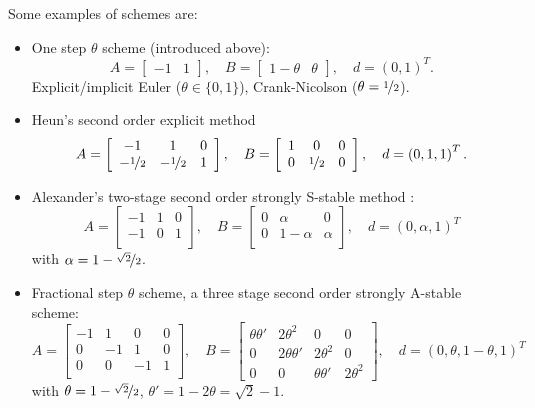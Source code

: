 \documentclass[a4paper,12pt]{article}
\begin{document}
Some examples of schemes are:
\begin{itemize}
\item One step $\theta$ scheme (introduced above):
\begin{equation*}
A = \left[\begin{array}{cc}
-1 & 1
\end{array}\right],
\quad B = \left[\begin{array}{cc}
1-\theta & \theta
\end{array}\right],
\quad d = \left(
0, 1
\right)^T.
\end{equation*}
Explicit/implicit Euler ($\theta\in\{0,1\}$), Crank-Nicolson ($\theta=\nicefrac12$).
\item Heun's second order explicit method
\begin{equation*}
A = \left[\begin{array}{ccc}
-1 & 1 & 0\\
-\nicefrac12 & -\nicefrac12 & 1\\
\end{array}\right],
\quad B = \left[\begin{array}{ccc}
1 & 0 & 0\\
0 & \nicefrac12 & 0\\
\end{array}\right],
\quad d = \left(
0, 1, 1
\right)^T.
\end{equation*}
\item Alexander's two-stage second order strongly S-stable method \cite{alexander:77}:
\begin{equation*}
A = \left[\begin{array}{ccc}
-1 & 1 & 0\\
-1 & 0 & 1\\
\end{array}\right],
\quad B = \left[\begin{array}{ccc}
0 & \alpha     & 0\\
0 & 1-\alpha & \alpha\\
\end{array}\right],
\quad d = \left(
0, \alpha, 1
\right)^T
\end{equation*}
with $\alpha=1-\nicefrac{\sqrt{2}}{2}$.
\item Fractional step $\theta$ scheme, a three stage second order strongly A-stable scheme:
\begin{equation*}
A = \left[\begin{array}{rrrr}
-1 & 1 & 0 & 0\\
0  & -1 & 1 & 0\\
0  & 0 & -1 & 1\\
\end{array}\right],
\quad B = \left[\begin{array}{rrrr}
\theta \theta' & 2\theta^2 & 0 & 0\\
0 & 2\theta\theta' & 2\theta^2 & 0\\
0 & 0 & \theta\theta' & 2\theta^2
\end{array}\right],
\quad d = \left(
0, \theta, 1-\theta, 1
\right)^T
\end{equation*}
with $\theta=1-\nicefrac{\sqrt{2}}{2}$, $\theta' = 1-2\theta = \sqrt{2}-1$.
\end{itemize}
\end{document}
